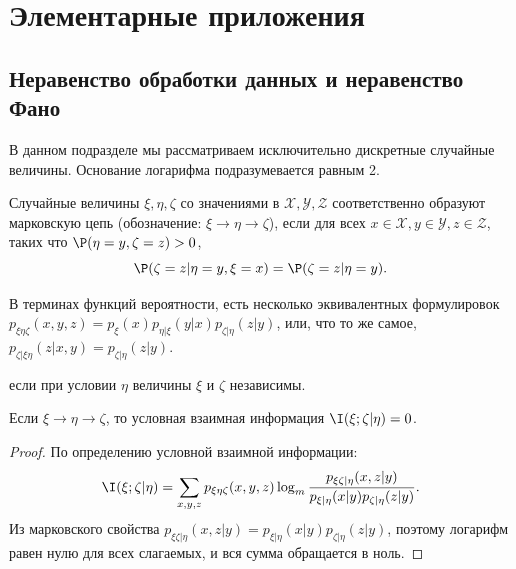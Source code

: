\section{Элементарные приложения}

\subsection{Неравенство обработки данных и неравенство Фано}

В данном подразделе мы рассматриваем исключительно дискретные случайные величины. Основание логарифма подразумевается равным 2. 

\begin{definition}
	Случайные величины $\xi, \eta, \zeta$ со значениями в $\mathcal{X}, \mathcal{Y},\mathcal{Z}$ соответственно образуют марковскую цепь (обозначение: $\xi \to \eta \to \zeta$), если для всех $x \in \mathcal{X}, y \in \mathcal{Y}, z \in \mathcal{Z}$, таких что $\P(\eta = y, \zeta = z) > 0$,
	\[
		\P(\zeta = z | \eta = y, \xi = x) = \P(\zeta = z | \eta = y).
	\]
\end{definition}
\begin{remark}
	В терминах функций вероятности, есть несколько эквивалентных формулировок
	$p_{\xi\eta\zeta}(x,y,z) = p_\xi(x) p_{\eta|\xi}(y|x) p_{\zeta|\eta}(z|y)$,
	или, что то же самое, $p_{\zeta|\xi\eta}(z|x,y) = p_{\zeta|\eta}(z|y)$.
\end{remark}
\begin{remark}
	если при условии $\eta$ величины $\xi$ и $\zeta$ независимы. 
\end{remark}
\begin{lemma}
	\label{lem:cond-indep-markov}
	Если $\xi \to \eta \to \zeta$, то условная взаимная информация $\I(\xi; \zeta | \eta) = 0$.
\end{lemma}
\begin{proof}
	По определению условной взаимной информации:
	\[
		\I(\xi; \zeta | \eta) = \sum_{x,y,z} p_{\xi\eta\zeta}(x,y,z) \log_m \frac{p_{\xi\zeta|\eta}(x,z|y)}{p_{\xi|\eta}(x|y) p_{\zeta|\eta}(z|y)}.
	\]
	Из марковского свойства $p_{\xi\zeta|\eta}(x,z|y) = p_{\xi|\eta}(x|y) p_{\zeta|\eta}(z|y)$, поэтому логарифм равен нулю для всех слагаемых, и вся сумма обращается в ноль.
\end{proof}

